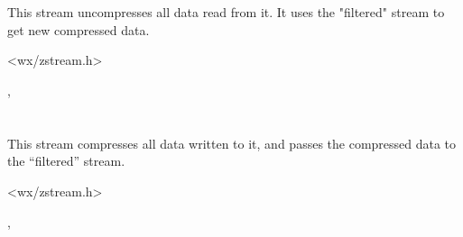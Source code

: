 \section{}\label{wxzlibinputstream}

This stream uncompresses all data read from it. It uses the "filtered"
stream to get new compressed data.




<wx/zstream.h>


, 

\section{}\label{wxzliboutputstream}

This stream compresses all data written to it, and passes the compressed data
to the ``filtered'' stream.




<wx/zstream.h>


, 

